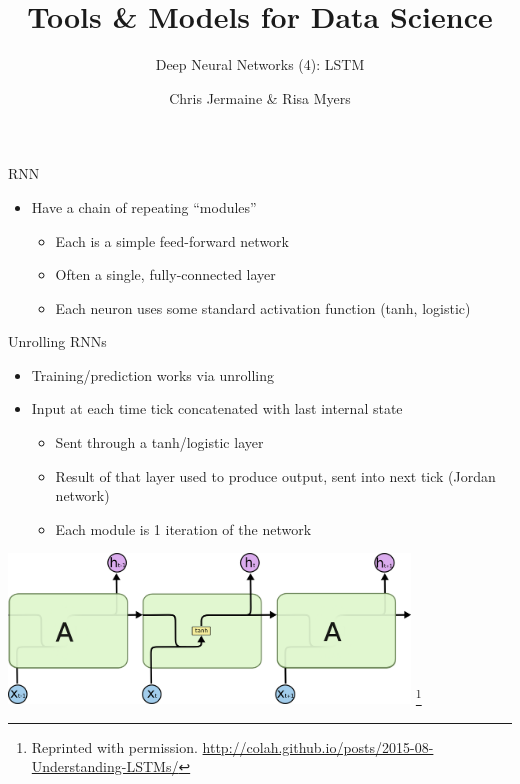 \documentclass[aspectratio=169]{beamer}
\title[]
{Tools \& Models for Data Science}
\subtitle{Deep Neural Networks (4): LSTM}
\author[]{Chris Jermaine \& Risa Myers}
\institute
{
  Rice University 
}
\date[]{}
\begin{document}
\begin{frame}
 \titlepage
\end{frame}
\begin{frame}{RNN}

\begin{itemize}
	\item Have a chain of repeating ``modules'' 
	\begin{itemize}
	\item Each is a simple feed-forward network
	\item Often a single, fully-connected layer
	\item Each neuron uses some standard activation function (tanh, logistic)
	\end{itemize}
\end{itemize}
\end{frame}
\begin{frame}{Unrolling RNNs}

\begin{itemize}
	\item Training/prediction works via unrolling
	\item Input at each time tick concatenated with last internal state
\begin{itemize}
	\item Sent through a tanh/logistic layer
	\item Result of that layer used to produce output, sent into next tick (Jordan network)
	\item Each module is 1 iteration of the network
\end{itemize}
\end{itemize}
\includegraphics[width=0.8\textwidth]{lectLSTM/LSTM3-SimpleRNN.png}
\footnote{Reprinted with permission. \url{http://colah.github.io/posts/2015-08-Understanding-LSTMs/}}
\end{frame}
\end{document}
